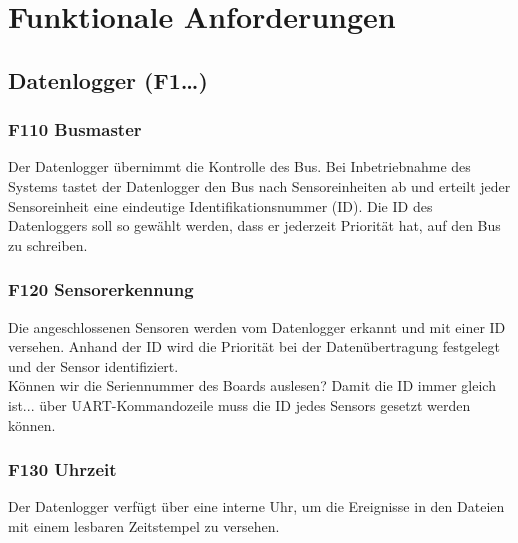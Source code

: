 %
%

\thispagestyle{empty}
\chapter{Funktionale Anforderungen}\label{chap.funktionale}
\section{Datenlogger (F1\ldots)}


\subsection{F110 Busmaster}
Der Datenlogger übernimmt die Kontrolle des Bus. Bei Inbetriebnahme des Systems tastet der Datenlogger den Bus nach Sensoreinheiten ab und erteilt jeder Sensoreinheit eine eindeutige Identifikationsnummer (ID). Die ID des Datenloggers soll so gewählt werden, dass er jederzeit Priorität hat, auf den Bus zu schreiben.


\subsection{F120 Sensorerkennung}
Die angeschlossenen Sensoren werden vom Datenlogger erkannt und mit einer ID versehen. Anhand der ID wird die Priorität bei der Datenübertragung festgelegt und der Sensor identifiziert.\\
Können wir die Seriennummer des Boards auslesen? Damit die ID immer gleich ist... über UART-Kommandozeile muss die ID jedes Sensors gesetzt werden können.


\subsection{F130 Uhrzeit}
Der Datenlogger verfügt über eine interne Uhr, um die Ereignisse in den Dateien mit einem lesbaren Zeitstempel zu versehen.


